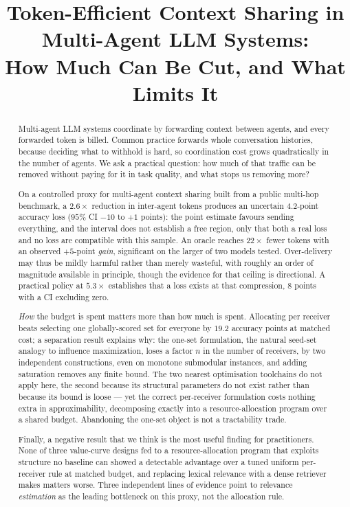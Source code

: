 \documentclass[sigconf,anonymous]{aamas}
\theoremstyle{remark}
\begin{document}
\title{Token-Efficient Context Sharing in Multi-Agent LLM Systems:\\
How Much Can Be Cut, and What Limits It}

\begin{abstract}
Multi-agent LLM systems coordinate by forwarding context between
agents, and every forwarded token is billed. Common practice forwards
whole conversation histories, because deciding what to withhold is
hard, so coordination cost grows quadratically in the number of
agents. We ask a practical question: how much of that traffic can be
removed without paying for it in task quality, and what stops us
removing more?

On a controlled proxy for multi-agent context sharing built from a
public multi-hop benchmark, a $2.6\times$ reduction in inter-agent
tokens produces an uncertain $4.2$-point accuracy loss ($95\%$ CI
$-10$ to $+1$ points): the point estimate favours sending everything,
and the interval does not establish a free region, only that both a
real loss and no loss are compatible with this sample. An oracle
reaches $22\times$ fewer tokens with an observed $+5$-point
\emph{gain}, significant on the larger of two models tested. Over-delivery
may thus be mildly harmful rather than merely wasteful, with roughly
an order of magnitude available in principle, though the evidence for
that ceiling is directional. A practical policy at $5.3\times$
establishes that a loss exists at that compression, $8$ points with a
CI excluding zero.

\emph{How} the budget is spent matters more than how much is spent.
Allocating per receiver beats selecting one globally-scored set for
everyone by $19.2$ accuracy points at matched cost; a separation result
explains why: the one-set formulation, the natural seed-set analogy to
influence maximization, loses a factor $n$ in the number of receivers,
by two independent constructions, even on monotone submodular
instances, and adding saturation removes any finite bound. The two
nearest optimisation toolchains do not apply here, the second because
its structural parameters do not exist rather than because its bound
is loose --- yet the correct per-receiver formulation costs nothing
extra in approximability, decomposing exactly into a
resource-allocation program over a shared budget. Abandoning the
one-set object is not a tractability trade.

Finally, a negative result that we think is the most useful finding
for practitioners. None of three value-curve designs fed to a
resource-allocation program that exploits structure no baseline can
showed a detectable advantage over a tuned uniform per-receiver rule
at matched budget, and replacing lexical relevance with a dense
retriever makes matters worse. Three independent lines of evidence
point to relevance \emph{estimation} as the leading bottleneck on this
proxy, not the allocation rule.
\end{abstract}
\end{document}
